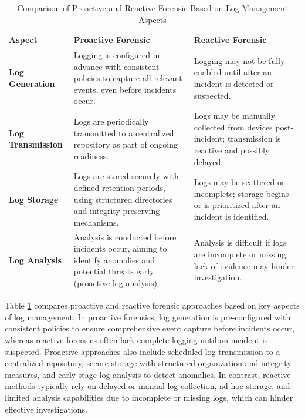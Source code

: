\begin{table}[H]
	\centering
	\caption{Comparison of Proactive and Reactive Forensic Based on Log Management Aspects}
	\label{tab:forensic-log-comparison}
	\begin{tabular}{|p{4cm}|p{5.5cm}|p{5.5cm}|}
		\hline
		\textbf{Aspect} & \textbf{Proactive Forensic} & \textbf{Reactive Forensic} \\
		\hline
		\textbf{Log Generation} & Logging is configured in advance with consistent policies to capture all relevant events, even before incidents occur. & Logging may not be fully enabled until after an incident is detected or suspected. \\
		\hline
		\textbf{Log Transmission} & Logs are periodically transmitted to a centralized repository as part of ongoing readiness. & Logs may be manually collected from devices post-incident; transmission is reactive and possibly delayed. \\
		\hline
		\textbf{Log Storage} & Logs are stored securely with defined retention periods, using structured directories and integrity-preserving mechanisms. & Logs may be scattered or incomplete; storage begins or is prioritized after an incident is identified. \\
		\hline
		\textbf{Log Analysis} & Analysis is conducted before incidents occur, aiming to identify anomalies and potential threats early (proactive log analysis). & Analysis is difficult if logs are incomplete or missing; lack of evidence may hinder investigation. \\
		\hline
	\end{tabular}
\end{table}


Table \ref{tab:forensic-log-comparison} compares proactive and reactive forensic approaches based on key aspects of log management. In proactive forensics, log generation is pre-configured with consistent policies to ensure comprehensive event capture before incidents occur, whereas reactive forensics often lack complete logging until an incident is suspected. Proactive approaches also include scheduled log transmission to a centralized repository, secure storage with structured organization and integrity measures, and early-stage log analysis to detect anomalies. In contrast, reactive methods typically rely on delayed or manual log collection, ad-hoc storage, and limited analysis capabilities due to incomplete or missing logs, which can hinder effective investigations.



